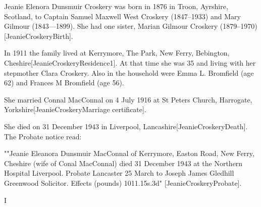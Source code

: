 Jeanie Elenora Dunsmuir Croskery was born in 1876 in Troon, Ayrshire, Scotland, to Captain Samuel Maxwell West Croskery (1847--1933) and Mary Gilmour (1843---1899). She had one sister, Marian Gilmour Croskery (1879--1970)[JeanieCroskeryBirth].

In 1911 the family lived at Kerrymore, The Park, New Ferry, Bebington, Cheshire[JeanieCroskeryResidence1]. At that time she was 35 and living with her stepmother Clara Croskery.  Also in the household were Emma L. Bromfield (age 62) and Frances M Bromfield (age 56). 

She married Connal MacConnal on 4 July 1916 at St Peters Church, Harrogate, Yorkshire[JeanieCroskeryMarriage certificate].


She died on 31 December 1943 in	Liverpool, Lancashire[JeanieCroskeryDeath].  The Probate notice read:

""Jeanie Eleanora Dunsmuir MacConnal of Kerrymore, Easton Road, New Ferry, Cheshire (wife of Conal MacConnal) died 31 December 1943 at the Northern Hospital Liverpool. Probate Lancaster 25 March to Joseph James Gledhill Greenwood Solicitor. Effects (pounds) 1011.15s.3d" [JeanieCroskeryProbate].

I
